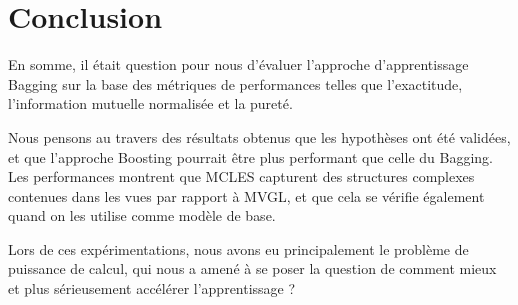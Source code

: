 \documentclass[12pt,a4paper]{report}
\begin{document}
    
	\section{Conclusion}
	En somme, il était question pour nous d'évaluer l'approche d'apprentissage Bagging sur la base des métriques de performances telles que l'exactitude, l'information mutuelle normalisée et la pureté.

	Nous pensons au travers des résultats obtenus que les hypothèses ont été validées, et que l'approche Boosting pourrait être plus performant que celle du Bagging. Les performances montrent que MCLES capturent des structures complexes contenues dans les vues par rapport à MVGL, et que cela se vérifie également quand on les utilise comme modèle de base. 

Lors de ces expérimentations, nous avons eu principalement le problème de puissance de calcul, qui nous a amené à se poser la question de comment mieux et plus sérieusement accélérer l'apprentissage ?
    
%
\end{document}
